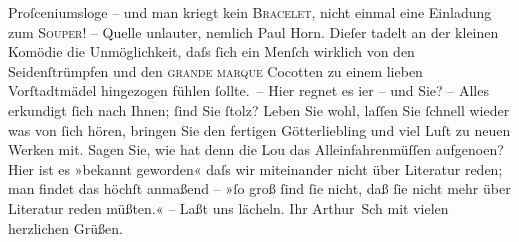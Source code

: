 \begin{ledgroupsized}[t]{13cm}
               Proſceniumsloge – und {\pb}man kriegt kein \textsc{Bracelet}, nicht einmal eine Einladung zum \textsc{Souper}! – Quelle unlauter, nemlich Paul Horn. Dieſer tadelt an der kleinen Komödie die Unmöglichkeit, daſs ſich ein Menſch
               wirklich von den Seidenſtrümpfen und den \textsc{grande marque}
               Cocotten zu einem lieben Vorſtadtmädel hingezogen fühlen ſollte. –\pend
           \pstart
           Hier regnet es i{\geminationm}er – und Sie? – Alles erkundigt ſich
               nach Ihnen; ſind Sie ſtolz? Leben Sie wohl, laſſen Sie ſchnell {\pb}wieder was von ſich hören, bringen Sie den fertigen
                  Götterliebling und viel Luſt
               zu neuen Werken mit. Sagen Sie, wie hat denn die Lou das Alleinfahrenmüſſen aufgeno{\geminationm}en? Hier ist
               es »bekannt geworden« daſs wir miteinander nicht über Literatur reden; man findet das
               höchſt anmaßend – »ſo groß ſind ſie nicht, daß ſie nicht mehr über Literatur reden
               müßten.« – Laßt uns lächeln.\pend
           \pstart Ihr \spacefill\mbox{Arthur Sch} mit vielen herzlichen Grüßen.\pend{}\endnumbering{}\end{ledgroupsized}  \newcommand{\dateiname}{L00483}\newcommand{\titel}{Arthur Schnitzler an Richard Beer-Hofmann, 15. 9. 1895}\newcommand{\editorInnen}{ Martin Anton Müller und Gerd-Hermann Susen}
            \footnotesize
\begin{ledgroupsized}[t]{11.5cm}
\end{ledgroupsized}
         
      